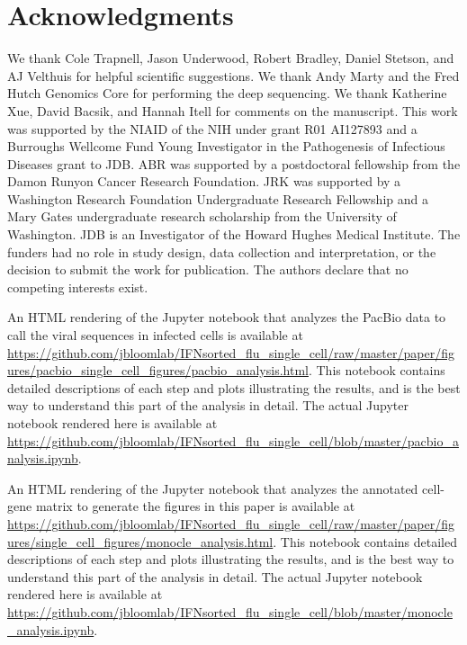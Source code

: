 \documentclass[9pt,lineno]{elife}
\begin{document}
\section{Acknowledgments}
We thank Cole Trapnell, Jason Underwood, Robert Bradley, Daniel Stetson, and AJ Velthuis for helpful scientific suggestions.
We thank Andy Marty and the Fred Hutch Genomics Core for performing the deep sequencing.
We thank Katherine Xue, David Bacsik, and Hannah Itell for comments on the manuscript.
This work was supported by the NIAID of the NIH under grant R01 AI127893 and a Burroughs Wellcome Fund Young Investigator in the Pathogenesis of Infectious Diseases grant to JDB.
ABR was supported by a postdoctoral fellowship from the Damon Runyon Cancer Research Foundation.
JRK was supported by a Washington Research Foundation Undergraduate Research Fellowship and a Mary Gates undergraduate research scholarship from the University of Washington.
JDB is an Investigator of the Howard Hughes Medical Institute.
The funders had no role in study design, data collection and interpretation, or the decision to submit the work for publication.
The authors declare that no competing interests exist.

\nolinenumbers



\clearpage

\begin{suppfile}
\caption{\label{suppfile:pacbio_analysis}
An HTML rendering of the Jupyter notebook that analyzes the PacBio data to call the viral sequences in infected cells is available at \url{https://github.com/jbloomlab/IFNsorted_flu_single_cell/raw/master/paper/figures/pacbio_single_cell_figures/pacbio_analysis.html}.
This notebook contains detailed descriptions of each step and plots illustrating the results, and is the best way to understand this part of the analysis in detail.
The actual Jupyter notebook rendered here is available at \url{https://github.com/jbloomlab/IFNsorted_flu_single_cell/blob/master/pacbio_analysis.ipynb}.}
\end{suppfile}

\begin{suppfile}
\caption{\label{suppfile:monocle_analysis}
An HTML rendering of the Jupyter notebook that analyzes the annotated cell-gene matrix to generate the figures in this paper is available at \url{https://github.com/jbloomlab/IFNsorted_flu_single_cell/raw/master/paper/figures/single_cell_figures/monocle_analysis.html}.
This notebook contains detailed descriptions of each step and plots illustrating the results, and is the best way to understand this part of the analysis in detail.
The actual Jupyter notebook rendered here is available at \url{https://github.com/jbloomlab/IFNsorted_flu_single_cell/blob/master/monocle_analysis.ipynb}.}
\end{suppfile}
\end{document}
